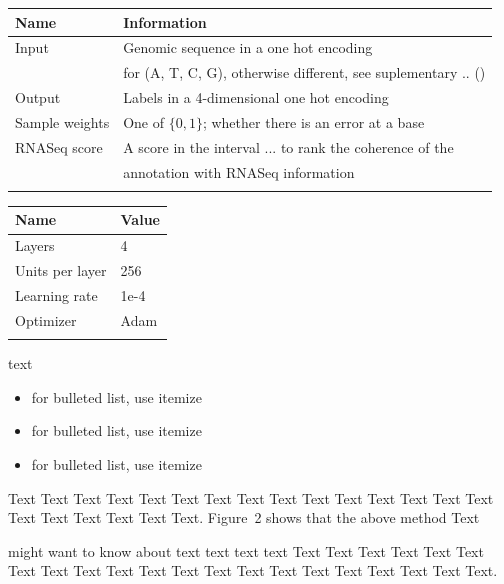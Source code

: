 \documentclass{bioinfo}
\begin{document}
\begin{methods}
\begin{table}[!t]
 {
\begin{tabular}{@{}ll@{}}
\toprule Name & Information \\
\midrule
Input & Genomic sequence in a one hot encoding\\
	  & for (A, T, C, G), otherwise different, see suplementary .. ()\\
Output & Labels in a 4-dimensional one hot encoding \\
Sample weights & One of $\{0,1\}$; whether there is an error at a base\\
RNASeq score & A score in the interval $...$ to rank the coherence of the \\
		     & annotation with RNASeq information \\
\botrule
\end{tabular}}{}
\end{table}

\begin{table}[!t]
 {
\begin{tabular}{@{}ll@{}}
\toprule Name & Value \\
\midrule
Layers & 4\\
Units per layer & 256\\
Learning rate & 1e-4\\
Optimizer & Adam\\
\botrule
\end{tabular}}{}
\end{table}

text\vspace*{1pt}

\begin{itemize}
\item for bulleted list, use itemize
\item for bulleted list, use itemize
\item for bulleted list, use itemize\vspace*{1pt}
\end{itemize}

Text Text Text Text Text Text  Text Text Text Text Text Text Text
Text Text  Text Text Text Text Text Text.
Figure~2\vphantom{\ref{fig:02}} shows that the above method  Text

\citealp{Boffelli03} might want to know about  text text text text
Text Text Text Text Text Text  Text Text Text Text Text Text Text
Text Text  Text Text Text Text Text Text.

\end{methods}
\end{document}
